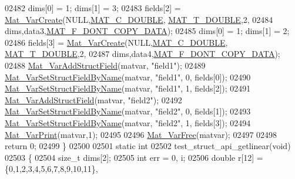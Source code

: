 \begin{DoxyCode}
{{{{{{{{02482     dims[0] = 1; dims[1] = 3;
02483     fields[2] = \hyperlink{group___m_a_t_ga1c54a84bb4d810c6fccdb8869489eac4}{Mat\_VarCreate}(NULL,\hyperlink{group___m_a_t_ggad4d60ae7b709fc81bfd744fb4c857c40a5d70e0862e5bdb7bd86bf7ba5948f307}{MAT\_C\_DOUBLE},
      \hyperlink{group___m_a_t_ggacf7b3b879282b7ab3a51190e49bf3453a31e721ecf7e188196f83c32838288797}{MAT\_T\_DOUBLE},2,
02484                               dims,data3,\hyperlink{group___m_a_t_ggab9d6ef9e3ddca78a317b173f01d53fbba762244499f52eb35e7b53fb79a1f2889}{MAT\_F\_DONT\_COPY\_DATA});
02485     dims[0] = 1; dims[1] = 2;
02486     fields[3] = \hyperlink{group___m_a_t_ga1c54a84bb4d810c6fccdb8869489eac4}{Mat\_VarCreate}(NULL,\hyperlink{group___m_a_t_ggad4d60ae7b709fc81bfd744fb4c857c40a5d70e0862e5bdb7bd86bf7ba5948f307}{MAT\_C\_DOUBLE},
      \hyperlink{group___m_a_t_ggacf7b3b879282b7ab3a51190e49bf3453a31e721ecf7e188196f83c32838288797}{MAT\_T\_DOUBLE},2,
02487                               dims,data4,\hyperlink{group___m_a_t_ggab9d6ef9e3ddca78a317b173f01d53fbba762244499f52eb35e7b53fb79a1f2889}{MAT\_F\_DONT\_COPY\_DATA});
02488     \hyperlink{group___m_a_t_gaef5689cace7c4165c3cbf8fa17d1ebcd}{Mat\_VarAddStructField}(matvar, \textcolor{stringliteral}{"field1"});
02489     \hyperlink{group___m_a_t_ga702f2b853c605c94a8af50555fc7183b}{Mat\_VarSetStructFieldByName}(matvar, \textcolor{stringliteral}{"field1"}, 0, fields[0]);
02490     \hyperlink{group___m_a_t_ga702f2b853c605c94a8af50555fc7183b}{Mat\_VarSetStructFieldByName}(matvar, \textcolor{stringliteral}{"field1"}, 1, fields[2]);
02491     \hyperlink{group___m_a_t_gaef5689cace7c4165c3cbf8fa17d1ebcd}{Mat\_VarAddStructField}(matvar, \textcolor{stringliteral}{"field2"});
02492     \hyperlink{group___m_a_t_ga702f2b853c605c94a8af50555fc7183b}{Mat\_VarSetStructFieldByName}(matvar, \textcolor{stringliteral}{"field2"}, 0, fields[1]);
02493     \hyperlink{group___m_a_t_ga702f2b853c605c94a8af50555fc7183b}{Mat\_VarSetStructFieldByName}(matvar, \textcolor{stringliteral}{"field2"}, 1, fields[3]);
02494     \hyperlink{group___m_a_t_ga9100c145e338b84b55d5d0795d5d390a}{Mat\_VarPrint}(matvar,1);
02495 
02496     \hyperlink{group___m_a_t_ga1d14716f7450530fd1c9d02413787f0e}{Mat\_VarFree}(matvar);
02497 
02498     \textcolor{keywordflow}{return} 0;
02499 \}
02500 
02501 \textcolor{keyword}{static} \textcolor{keywordtype}{int}
02502 test\_struct\_api\_getlinear(\textcolor{keywordtype}{void})
02503 \{
02504     \textcolor{keywordtype}{size\_t} dims[2];
02505     \textcolor{keywordtype}{int}    err = 0, i;
02506     \textcolor{keywordtype}{double}    r[12] = \{0,1,2,3,4,5,6,7,8,9,10,11\},
}}}}}}}}
\end{DoxyCode}
